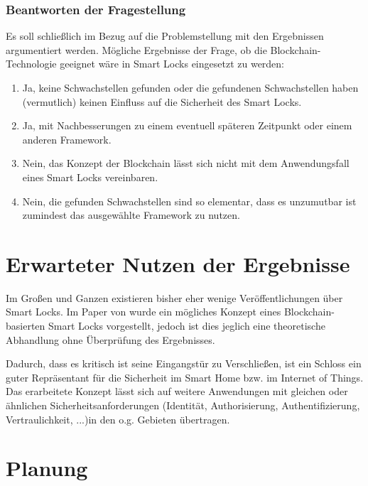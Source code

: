         \subsubsection*{Beantworten der Fragestellung}
            Es soll schließlich im Bezug auf die Problemstellung mit den Ergebnissen argumentiert werden.
            Mögliche Ergebnisse der Frage, ob die Blockchain-Technologie geeignet wäre in Smart Locks eingesetzt zu werden:
            \begin{enumerate}
                \item Ja, keine Schwachstellen gefunden oder die gefundenen Schwachstellen haben (vermutlich) keinen Einfluss auf die Sicherheit des Smart Locks.
                \item Ja, mit Nachbesserungen zu einem eventuell späteren Zeitpunkt oder einem anderen Framework.
                \item Nein, das Konzept der Blockchain lässt sich nicht mit dem Anwendungsfall eines Smart Locks vereinbaren.
                \item Nein, die gefunden Schwachstellen sind so elementar, dass es unzumutbar ist zumindest das ausgewählte Framework zu nutzen.
            \end{enumerate}


\section*{Erwarteter Nutzen der Ergebnisse}
    Im Großen und Ganzen existieren bisher eher wenige Veröffentlichungen über Smart Locks.
    Im Paper von \cite{Han2017} wurde ein mögliches Konzept eines Blockchain-basierten Smart Locks vorgestellt, jedoch ist dies jeglich eine theoretische Abhandlung ohne Überprüfung des Ergebnisses.
    
    Dadurch, dass es kritisch ist seine Eingangstür zu Verschließen, ist ein Schloss ein guter Repräsentant für die Sicherheit im Smart Home bzw. im Internet of Things. 
    Das erarbeitete Konzept lässt sich auf weitere Anwendungen mit gleichen oder ähnlichen Sicherheitsanforderungen (Identität, Authorisierung, Authentifizierung, Vertraulichkeit, ...)in den o.g. Gebieten übertragen.

\section*{Planung}

